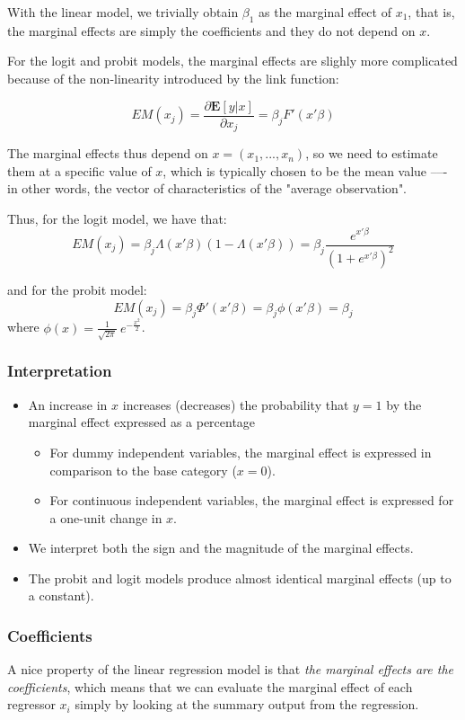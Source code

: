 With the linear model, we trivially obtain $\beta_1$ as the marginal effect of $x_1$, that is, the marginal effects are simply the coefficients and they do not depend on $x$.

For the logit and probit models, the marginal effects are slighly more complicated because of the non-linearity introduced by the link function:

\begin{equation}
    EM(x_j) = \frac{\partial \mathbf{E}[y|x]}{\partial x_j} = \beta_j F'(x'\beta)
\end{equation}

The marginal effects thus depend on $x = (x_1, ..., x_n)$, so we need to estimate them at a specific value of $x$, which is typically chosen to be the mean value ––- in other words, the vector of characteristics of the "average observation".

Thus, for the logit model, we have that:
$$
    EM(x_j) = \beta_j\Lambda(x'\beta)(1-\Lambda(x'\beta)) = \beta_j\frac{e^{x'\beta}}{(1+e^{x'\beta})^2}
$$

and for the probit model:
$$
    EM(x_j) = \beta_j\Phi'(x'\beta) = \beta_j\phi(x'\beta) = \beta_j
$$
where $\phi(x) = \frac{1}{\sqrt{2\pi}}\ e^{-\frac{x^2}{2}}$.

\subsubsection{Interpretation}

\begin{itemize}
    \item An increase in $x$ increases (decreases) the probability that $y=1$ by the marginal effect
expressed as a percentage
    \begin{itemize}
        \item For dummy independent variables, the marginal effect is expressed in comparison to the
    base category ($x=0$).
        \item For continuous independent variables, the marginal effect is expressed for a one-unit
    change in $x$.
    \end{itemize}
    \item We interpret both the sign and the magnitude of the marginal effects.
    \item The probit and logit models produce almost identical marginal effects (up to a constant).
\end{itemize}

\subsubsection{Coefficients}
A nice property of the linear regression model is that \textit{the marginal effects are the coefficients}, which means that we can evaluate the marginal effect of each regressor $x_i$ simply by looking at the summary output from the regression.


